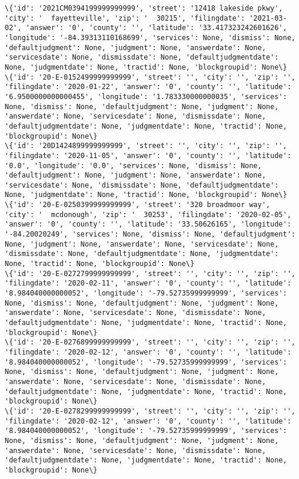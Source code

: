 \documentclass[11pt]{article}
\begin{document}
\begin{Verbatim}[commandchars=\\\{\}]
\{'id': '2021CM0394199999999999', 'street': '12418 lakeside pkwy', 'city': '  fayetteville', 'zip': '  30215', 'filingdate': '2021-03-02', 'answer': '0', 'county': '', 'latitude': '33.417323242601626', 'longitude': '-84.39313110168699', 'services': None, 'dismiss': None, 'defaultjudgment': None, 'judgment': None, 'answerdate': None, 'servicesdate': None, 'dismissdate': None, 'defaultjudgmentdate': None, 'judgmentdate': None, 'tractid': None, 'blockgroupid': None\}
\{'id': '20-E-0152499999999999', 'street': '', 'city': '', 'zip': '', 'filingdate': '2020-01-22', 'answer': '0', 'county': '', 'latitude': '6.9500000000000455', 'longitude': '1.783330000000035', 'services': None, 'dismiss': None, 'defaultjudgment': None, 'judgment': None, 'answerdate': None, 'servicesdate': None, 'dismissdate': None, 'defaultjudgmentdate': None, 'judgmentdate': None, 'tractid': None, 'blockgroupid': None\}
\{'id': '20D1424899999999999', 'street': '', 'city': '', 'zip': '', 'filingdate': '2020-11-05', 'answer': '0', 'county': '', 'latitude': '0.0', 'longitude': '0.0', 'services': None, 'dismiss': None, 'defaultjudgment': None, 'judgment': None, 'answerdate': None, 'servicesdate': None, 'dismissdate': None, 'defaultjudgmentdate': None, 'judgmentdate': None, 'tractid': None, 'blockgroupid': None\}
\{'id': '20-E-0250399999999999', 'street': '320 broadmoor way', 'city': '  mcdonough', 'zip': '  30253', 'filingdate': '2020-02-05', 'answer': '0', 'county': '', 'latitude': '33.50626165', 'longitude': '-84.20020249', 'services': None, 'dismiss': None, 'defaultjudgment': None, 'judgment': None, 'answerdate': None, 'servicesdate': None, 'dismissdate': None, 'defaultjudgmentdate': None, 'judgmentdate': None, 'tractid': None, 'blockgroupid': None\}
\{'id': '20-E-0272799999999999', 'street': '', 'city': '', 'zip': '', 'filingdate': '2020-02-11', 'answer': '0', 'county': '', 'latitude': '8.984040000000052', 'longitude': '-79.52735999999999', 'services': None, 'dismiss': None, 'defaultjudgment': None, 'judgment': None, 'answerdate': None, 'servicesdate': None, 'dismissdate': None, 'defaultjudgmentdate': None, 'judgmentdate': None, 'tractid': None, 'blockgroupid': None\}
\{'id': '20-E-0276899999999999', 'street': '', 'city': '', 'zip': '', 'filingdate': '2020-02-12', 'answer': '0', 'county': '', 'latitude': '8.984040000000052', 'longitude': '-79.52735999999999', 'services': None, 'dismiss': None, 'defaultjudgment': None, 'judgment': None, 'answerdate': None, 'servicesdate': None, 'dismissdate': None, 'defaultjudgmentdate': None, 'judgmentdate': None, 'tractid': None, 'blockgroupid': None\}
\{'id': '20-E-0278299999999999', 'street': '', 'city': '', 'zip': '', 'filingdate': '2020-02-12', 'answer': '0', 'county': '', 'latitude': '8.984040000000052', 'longitude': '-79.52735999999999', 'services': None, 'dismiss': None, 'defaultjudgment': None, 'judgment': None, 'answerdate': None, 'servicesdate': None, 'dismissdate': None, 'defaultjudgmentdate': None, 'judgmentdate': None, 'tractid': None, 'blockgroupid': None\}

\end{Verbatim}
\end{document}
